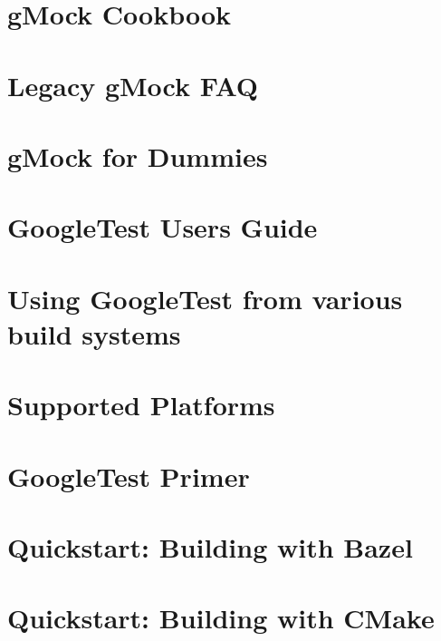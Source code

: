 \let\mypdfximage\pdfximage\def\pdfximage{\immediate\mypdfximage}\documentclass[twoside]{book}
\newcommand{\+}{\discretionary{\mbox{\scriptsize$\hookleftarrow$}}{}{}}
\begin{document}
\chapter{g\+Mock Cookbook}
\label{md_googletest_docs_gmock_cook_book}

\chapter{Legacy g\+Mock FAQ}
\label{md_googletest_docs_gmock_faq}

\chapter{g\+Mock for Dummies}
\label{md_googletest_docs_gmock_for_dummies}

\chapter{Google\+Test User\textquotesingle{}s Guide}
\label{md_googletest_docs_index}

\chapter{Using Google\+Test from various build systems}
\label{md_googletest_docs_pkgconfig}

\chapter{Supported Platforms}
\label{md_googletest_docs_platforms}

\chapter{Google\+Test Primer}
\label{md_googletest_docs_primer}

\chapter{Quickstart\+: Building with Bazel}
\label{md_googletest_docs_quickstart_bazel}

\chapter{Quickstart\+: Building with CMake}
\label{md_googletest_docs_quickstart_cmake}

\end{document}
